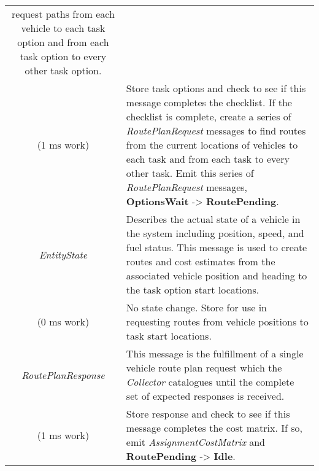 \begin{longtable}[]{@{}cl@{}}
\begin{minipage}[t]{0.55\columnwidth}
request paths from each vehicle to each task option and from each task
option to every other task option.\strut
\end{minipage}\tabularnewline
\begin{minipage}[t]{0.4\columnwidth}\centering\strut
(1 ms work)\strut
\end{minipage} & \begin{minipage}[t]{0.55\columnwidth}\raggedright\strut
Store task options and check to see if this message completes the
checklist. If the checklist is complete, create a series of
\emph{RoutePlanRequest} messages to find routes from the current
locations of vehicles to each task and from each task to every other
task. Emit this series of \emph{RoutePlanRequest} messages,
\textbf{OptionsWait} -\textgreater{} \textbf{RoutePending}.\strut
\end{minipage}\tabularnewline
\begin{minipage}[t]{0.40\columnwidth}\centering\strut
\emph{EntityState}\strut
\end{minipage} & \begin{minipage}[t]{0.55\columnwidth}\raggedright\strut
Describes the actual state of a vehicle in the system including
position, speed, and fuel status. This message is used to create routes
and cost estimates from the associated vehicle position and heading to
the task option start locations.\strut
\end{minipage}\tabularnewline
\begin{minipage}[t]{0.40\columnwidth}\centering\strut
(0 ms work)\strut
\end{minipage} & \begin{minipage}[t]{0.55\columnwidth}\raggedright\strut
No state change. Store for use in requesting routes from vehicle
positions to task start locations.\strut
\end{minipage}\tabularnewline
\begin{minipage}[t]{0.40\columnwidth}\centering\strut
\emph{RoutePlanResponse}\strut
\end{minipage} & \begin{minipage}[t]{0.55\columnwidth}\raggedright\strut
This message is the fulfillment of a single vehicle route plan request
which the \emph{Collector} catalogues until the complete set of expected
responses is received.\strut
\end{minipage}\tabularnewline
\begin{minipage}[t]{0.40\columnwidth}\centering\strut
(1 ms work)\strut
\end{minipage} & \begin{minipage}[t]{0.55\columnwidth}\raggedright\strut
Store response and check to see if this message completes the cost
matrix. If so, emit \emph{AssignmentCostMatrix} and
\textbf{RoutePending} -\textgreater{} \textbf{Idle}.\strut
\end{minipage}\tabularnewline
\bottomrule
\end{longtable}

